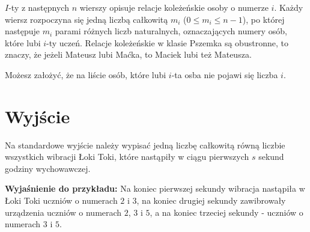 \documentclass[zad,zawodnik,utf8]{sinol}
\begin{document}
\begin{tasktext}
$I$-ty z następnych $n$ wierszy opisuje relacje koleżeńskie osoby o numerze $i$. Każdy wiersz rozpoczyna się jedną liczbą całkowitą $m_i$ 
($0 \leq m_i \leq n-1$), po której następuje $m_i$ parami różnych liczb naturalnych, oznaczających numery osób, które lubi $i$-ty uczeń. 
Relacje koleżeńskie w klasie Pszemka są obustronne, to znaczy, że jeżeli Mateusz lubi Maćka, to Maciek lubi też Mateusza. 

Możesz założyć, że na liście osób, które lubi $i$-ta osba nie pojawi się liczba $i$.


 \section{Wyjście}
Na standardowe wyjście należy wypisać jedną liczbę całkowitą równą liczbie wszystkich wibracji Łoki Toki, które nastąpiły w ciągu pierwszych $s$ sekund 
godziny wychowawczej.

\makecompactexample

\medskip
\noindent
\textbf{Wyjaśnienie do przykładu:} Na koniec pierwszej sekundy wibracja nastąpiła w Łoki Toki uczniów o numerach $2$ i $3$, na koniec drugiej sekundy
zawibrowały urządzenia uczniów o numerach $2$, $3$ i $5$, a na koniec trzeciej sekundy - uczniów o numerach $3$ i $5$.

\end{tasktext}
\end{document}
